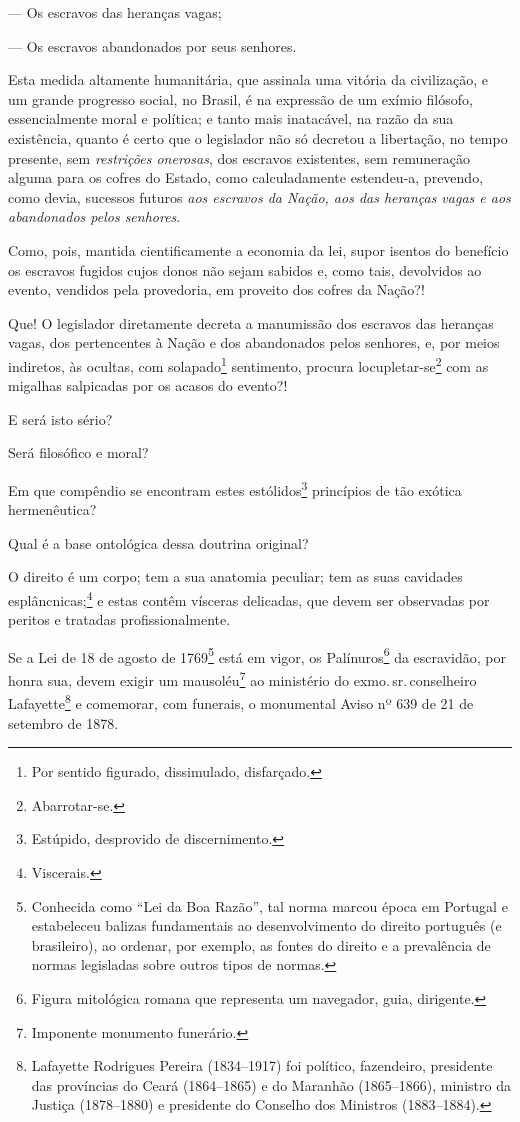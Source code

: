 {--- Os escravos das heranças vagas;

--- Os escravos abandonados por seus senhores.

Esta medida altamente humanitária, que assinala uma vitória da
civilização, e um grande progresso social, no Brasil, é na expressão de
um exímio filósofo, essencialmente moral e política; e tanto mais
inatacável, na razão da sua existência, quanto é certo que o legislador
não só decretou a libertação, no tempo presente, sem \emph{restrições
onerosas}, dos escravos existentes, sem remuneração alguma para os
cofres do Estado, como calculadamente estendeu-a, prevendo, como devia,
sucessos futuros \emph{aos escravos da Nação, aos das heranças vagas e
aos abandonados pelos senhores}.

Como, pois, mantida cientificamente a economia da lei, supor isentos do
benefício os escravos fugidos cujos donos não sejam sabidos e,
como tais, devolvidos ao evento, vendidos pela provedoria, em proveito
dos cofres da Nação?!

Que! O legislador diretamente decreta a manumissão dos escravos das
heranças vagas, dos pertencentes à Nação e dos abandonados pelos
senhores, e, por meios indiretos, às ocultas, com solapado\footnote{
  Por sentido figurado, dissimulado, disfarçado.} sentimento, procura
locupletar-se\footnote{Abarrotar-se.} com as migalhas salpicadas por
os acasos do evento?!

E será isto sério?

Será filosófico e moral?

Em que compêndio se encontram estes estólidos\footnote{Estúpido,
  desprovido de discernimento.} princípios de tão exótica hermenêutica?

Qual é a base ontológica dessa doutrina original?

O direito é um corpo; tem a sua anatomia peculiar; tem as suas cavidades
esplâncnicas;\footnote{Viscerais.} e estas contêm vísceras delicadas,
que devem ser observadas por peritos e tratadas profissionalmente.

Se a Lei de 18 de agosto de 1769\footnote{Conhecida como ``Lei da Boa
  Razão'', tal norma marcou época em Portugal e estabeleceu balizas
  fundamentais ao desenvolvimento do direito português (e brasileiro),
  ao ordenar, por exemplo, as fontes do direito e a prevalência de
  normas legisladas sobre outros tipos de normas.} está em vigor, os
Palínuros\footnote{Figura mitológica romana que representa um
  navegador, guia, dirigente.} da escravidão, por honra sua, devem
exigir um mausoléu\footnote{Imponente monumento funerário.} ao
ministério do exmo.\,sr.\,conselheiro Lafayette\footnote{Lafayette
  Rodrigues Pereira (1834--1917) foi político, fazendeiro, presidente
  das províncias do Ceará (1864--1865) e do Maranhão (1865--1866),
  ministro da Justiça (1878--1880) e presidente do Conselho dos Ministros
  (1883--1884).} e comemorar, com funerais, o monumental Aviso nº 639 de
21 de setembro de 1878.

}
